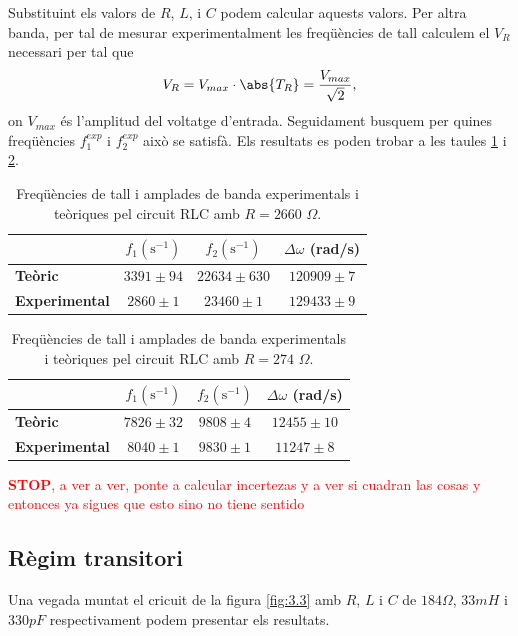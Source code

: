 \documentclass[a4paper,10.5pt]{report}
\begin{document}
Substituint els valors de $R$, $L$, i $C$ podem calcular aquests valors. Per altra banda, per tal de mesurar experimentalment les freqüències de tall calculem el $V_R$ necessari per tal que 
\begin{equation}
	V_R = V_{max} \cdot \abs{T_R} = \frac{V_{max}}{\sqrt{2}},
\end{equation}
on $V_{max}$ és l'amplitud del voltatge d'entrada. Seguidament busquem per quines freqüències $f_1^{exp}$ i $f_2^{exp}$ això se satisfà. Els resultats es poden trobar a les taules \ref{tab:3.2} i \ref{tab:3.3}.
\begin{table}[H]
	\centering
	\renewcommand{\arraystretch}{1.2}
	\caption{Freqüències de tall i amplades de banda experimentals i teòriques pel circuit RLC amb $R=2660$ $\Omega$.}
	\begin{tabular}{lccc}
		\toprule
		& $f_1 (\text{s}^{-1})$ & $f_2 (\text{s}^{-1})$ & $\Delta \omega$ (rad/s) \\ 
		\midrule
		\textbf{Teòric} & $3391 \pm 94$ & $22634 \pm 630$ & $120909 \pm 7$\\ 
		\textbf{Experimental} & $2860 \pm 1$ & $23460 \pm 1$ & $129433 \pm 9$\\ 
		\bottomrule
	\end{tabular}
	\label{tab:3.2}
\end{table}
\begin{table}[H]
	\centering
	\renewcommand{\arraystretch}{1.2}
	\caption{Freqüències de tall i amplades de banda experimentals i teòriques pel circuit RLC amb $R=274$ $\Omega$.}
	\begin{tabular}{lccc}
		\toprule
		& $f_1 (\text{s}^{-1})$ & $f_2 (\text{s}^{-1})$ & $\Delta \omega$ (rad/s) \\ 
		\midrule
		\textbf{Teòric} & $7826 \pm 32$ & $9808 \pm 4$ & $12455 \pm 10$\\ 
		\textbf{Experimental} & $8040 \pm 1$ & $9830 \pm 1$ & $11247 \pm 8$\\ 
		\bottomrule
	\end{tabular}
	\label{tab:3.3}
\end{table}
\textcolor{red}{\textbf{STOP}, a ver a ver, ponte a calcular incertezas y a ver si cuadran las cosas y entonces ya sigues que esto sino no tiene sentido}\\
\subsection{Règim transitori}
Una vegada muntat el cricuit de la figura \ref{fig:3.3} amb $R$, $L$ i $C$ de $184\Omega$, $33mH$ i $330pF$ respectivament podem presentar els resultats. 
\end{document}
